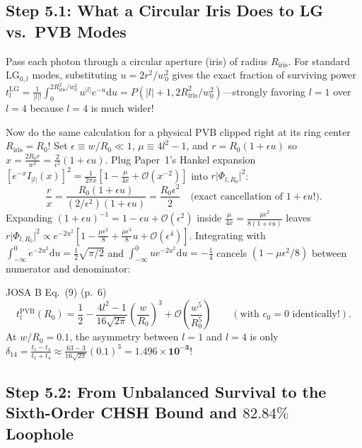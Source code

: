 \documentclass[10pt,letterpaper]{article}
\newcommand{\abs}[1]{\lvert #1 \rvert}
\newcommand{\dd}{\mathrm{d}}
\numberwithin{equation}{section}
\begin{document}
\subsection{Step 5.1: What a Circular Iris Does to LG vs.\ PVB Modes}

Pass each photon through a circular aperture (iris) of radius $R_{\mathrm{iris}}$. For standard $\mathrm{LG}_{0,l}$ modes, substituting $u = 2r^2/w_0^2$ gives the exact fraction of surviving power $t_l^{\mathrm{LG}} = \frac{1}{\abs{l}!}\int_0^{2R_{\mathrm{iris}}^2/w_0^2} u^{\abs{l}} e^{-u}\dd u = P(\abs{l}+1, 2R_{\mathrm{iris}}^2/w_0^2)$---strongly favoring $l = 1$ over $l = 4$ because $l = 4$ is much wider!

Now do the same calculation for a physical PVB clipped right at its ring center $R_{\mathrm{iris}} = R_0$! Set $\epsilon \equiv w/R_0 \ll 1$, $\mu \equiv 4l^2 - 1$, and $r = R_0(1 + \epsilon u)$ so $x = \frac{2R_0 r}{w^2} = \frac{2}{\epsilon^2}(1+\epsilon u)$. Plug Paper~1's Hankel expansion $[e^{-x}I_{\abs{l}}(x)]^2 = \frac{1}{2\pi x}[1 - \frac{\mu}{4x} + \mathcal{O}(x^{-2})]$ into $r\abs{\Phi_{l,R_0}}^2$:
\begin{equation}
  \frac{r}{x} = \frac{R_0(1+\epsilon u)}{(2/\epsilon^2)(1+\epsilon u)} = \frac{R_0\epsilon^2}{2}\quad\text{(exact cancellation of }1+\epsilon u\text{!)}.
\end{equation}
Expanding $(1+\epsilon u)^{-1} = 1 - \epsilon u + \mathcal{O}(\epsilon^2)$ inside $\frac{\mu}{4x} = \frac{\mu\epsilon^2}{8(1+\epsilon u)}$ leaves $r\abs{\Phi_{l,R_0}}^2 \propto e^{-2u^2}[1 - \frac{\mu\epsilon^2}{8} + \frac{\mu\epsilon^3}{8}u + \mathcal{O}(\epsilon^4)]$. Integrating with $\int_{-\infty}^0 e^{-2u^2}\dd u = \frac{1}{2}\sqrt{\pi/2}$ and $\int_{-\infty}^0 u e^{-2u^2}\dd u = -\frac{1}{4}$ cancels $(1 - \mu\epsilon^2/8)$ between numerator and denominator:

\begin{paperhit}{JOSA B Eq.~(9) (p.~6)}
\[
  t_l^{\mathrm{PVB}}(R_0) = \frac{1}{2} - \frac{4l^2 - 1}{16\sqrt{2\pi}}\left(\frac{w}{R_0}\right)^3 + \mathcal{O}\!\left(\frac{w^5}{R_0^5}\right) \qquad (\text{with }c_0 = 0\text{ identically!}).
\]
At $w/R_0 = 0.1$, the asymmetry between $l = 1$ and $l = 4$ is only $\delta_{14} = \frac{t_1-t_4}{t_1+t_4} \approx \frac{63-3}{16\sqrt{2\pi}}(0.1)^3 = \mathbf{1.496\times 10^{-3}}$!
\end{paperhit}

\subsection{Step 5.2: From Unbalanced Survival to the Sixth-Order CHSH Bound and $82.84\%$ Loophole}
\end{document}
